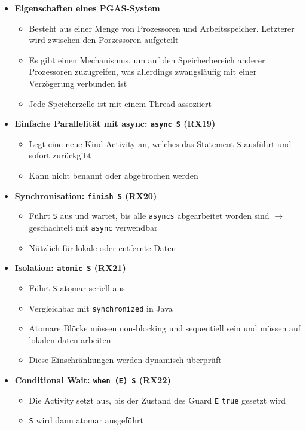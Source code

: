 \begin{itemize}
	\item \textbf{Eigenschaften eines PGAS-System}
	\begin{itemize}
		\item Besteht aus einer Menge von Prozessoren und Arbeitsspeicher. Letzterer wird zwischen den Porzessoren aufgeteilt
		\item Es gibt einen Mechanismus, um auf den Speicherbereich anderer Prozessoren zuzugreifen, was allerdings zwangsläufig mit einer Verzögerung verbunden ist
		\item Jede Speicherzelle ist mit einem Thread assoziiert
	\end{itemize}
	\item \textbf{Einfache Parallelität mit async: \texttt{async S} (RX19)}
	\begin{itemize}
		\item Legt eine neue Kind-Activity an, welches das Statement \texttt{S} ausführt und sofort zurückgibt
		\item Kann nicht benannt oder abgebrochen werden
	\end{itemize}
	\item \textbf{Synchronisation: \texttt{finish S} (RX20)}
	\begin{itemize}
		\item Führt \texttt{S} aus und wartet, bis alle \texttt{asyncs} abgearbeitet worden sind \(\rightarrow\) geschachtelt mit \texttt{async} verwendbar
		\item Nützlich für lokale oder entfernte Daten
	\end{itemize}
	\item \textbf{Isolation: \texttt{atomic S} (RX21)}
	\begin{itemize}
		\item Führt \texttt{S} atomar seriell aus
		\item Vergleichbar mit \texttt{synchronized} in Java
		\item Atomare Blöcke müssen non-blocking und sequentiell sein und müssen auf lokalen daten arbeiten
		\item Diese Einschränkungen werden dynamisch überprüft
	\end{itemize}
	\item \textbf{Conditional Wait: \texttt{when (E) S} (RX22)}
	\begin{itemize}
		\item Die Activity setzt aus, bis der Zustand des Guard \texttt{E} \texttt{true} gesetzt wird
		\item \texttt{S} wird dann atomar ausgeführt

\end{itemize}
\end{itemize}
